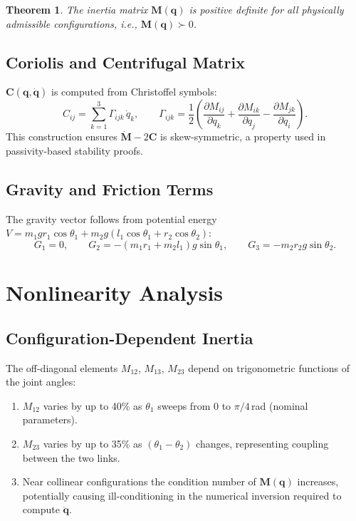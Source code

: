 \documentclass[11pt,a4paper]{article}
\newtheorem{theorem}{Theorem}[section]
\begin{document}
\begin{theorem}
The inertia matrix $\mathbf{M}(\mathbf{q})$ is positive definite for all
physically admissible configurations, i.e., $\mathbf{M}(\mathbf{q}) \succ 0$.
\end{theorem}

\subsection{Coriolis and Centrifugal Matrix}

$\mathbf{C}(\mathbf{q},\dot{\mathbf{q}})$ is computed from Christoffel symbols:
\begin{equation}
    C_{ij} = \sum_{k=1}^{3}\Gamma_{ijk}\,\dot{q}_k, \qquad
    \Gamma_{ijk} = \frac{1}{2}\!\left(
        \frac{\partial M_{ij}}{\partial q_k}
      + \frac{\partial M_{ik}}{\partial q_j}
      - \frac{\partial M_{jk}}{\partial q_i}\right).
\end{equation}
This construction ensures $\dot{\mathbf{M}} - 2\mathbf{C}$ is skew-symmetric,
a property used in passivity-based stability proofs.

\subsection{Gravity and Friction Terms}

The gravity vector follows from potential energy
$V = m_1 g r_1\cos\theta_1 + m_2 g(l_1\cos\theta_1 + r_2\cos\theta_2)$:
\begin{equation}
    G_1 = 0, \qquad
    G_2 = -(m_1 r_1 + m_2 l_1)g\sin\theta_1, \qquad
    G_3 = -m_2 r_2 g\sin\theta_2.
\end{equation}

\section{Nonlinearity Analysis}

\subsection{Configuration-Dependent Inertia}

The off-diagonal elements $M_{12}$, $M_{13}$, $M_{23}$ depend on trigonometric
functions of the joint angles:

\begin{enumerate}
    \item $M_{12}$ varies by up to 40\% as $\theta_1$ sweeps from $0$ to
          $\pi/4$\,rad (nominal parameters).
    \item $M_{23}$ varies by up to 35\% as $(\theta_1 - \theta_2)$ changes,
          representing coupling between the two links.
    \item Near collinear configurations the condition number of
          $\mathbf{M}(\mathbf{q})$ increases, potentially causing ill-conditioning
          in the numerical inversion required to compute $\ddot{\mathbf{q}}$.
\end{enumerate}
\end{document}
